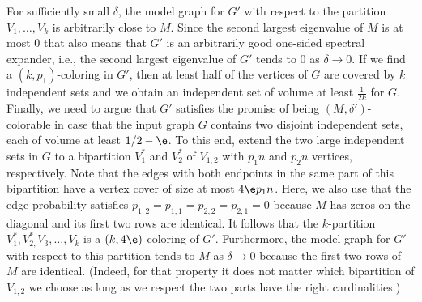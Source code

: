 For sufficiently small \(\delta\), the model graph for \(G'\) with respect to the partition \(V_{1},\ldots,V_{k}\) is arbitrarily close to \(M\).
Since the second largest eigenvalue of \(M\) is at most \(0\) that also means that \(G'\) is an arbitrarily good one-sided spectral expander, i.e., the second largest eigenvalue of \(G'\) tends to \(0\) as \(\delta\to 0\).
If we find a \((k,p_{1})\)-coloring in \(G'\), then at least half of the vertices of \(G\) are covered by \(k\) independent sets and we obtain an independent set of volume at least \(\tfrac{1}{2k}\) for \(G\).
Finally, we need to argue that \(G'\) satisfies the promise of being \((M,\delta')\)-colorable in case that the input graph \(G\) contains two disjoint independent sets, each of volume at least \(1/2-\e\).
To this end, extend the two large independent sets in \(G\) to a bipartition \(V^{*}_{1}\) and \(V^{*}_{2}\) of \(V_{1,2}\) with \(p_{1}n\) and \(p_{2}n\) vertices, respectively.
Note that the edges with both endpoints in the same part of this bipartition have a vertex cover of size at most \(4\e p_{1} n\).
Here, we also use that the edge probability satisfies \(p_{1,2}=p_{1,1}=p_{2,2}=p_{2,1}=0\) because \(M\) has zeros on the diagonal and its first two rows are identical.
It follows that the \(k\)-partition \(V^{*}_{1},V^{*}_{2,}V_{3},\ldots,V_{k}\) is a \((k,4\e)\)-coloring of \(G'\).
Furthermore, the model graph for \(G'\) with respect to this partition tends to \(M\) as \(\delta\to 0\) because the first two rows of \(M\) are identical.
(Indeed, for that property it does not matter which bipartition of \(V_{1,2}\) we choose as long as we respect the two parts have the right cardinalities.)










